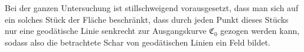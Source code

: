 Bei der ganzen Untersuchung ist stillschweigend vorausgesetzt, dass man
sich auf ein solches Stück der Fläche beschränkt, dass durch jeden Punkt
dieses Stücks nur eine geodätische Linie senkrecht zur Ausgangskurve $\mathfrak C_0$ gezogen
werden kann, sodass also die betrachtete Schar von geodätischen Linien
ein Feld bildet.
\par\clearpage\endgroup
